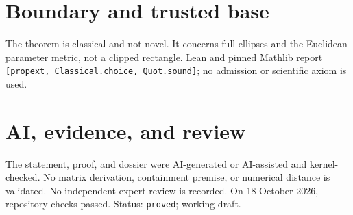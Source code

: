 \documentclass[11pt]{article}
\begin{document}
\section{Boundary and trusted base}
The theorem is classical and not novel. It concerns full ellipses and the Euclidean
parameter metric, not a clipped rectangle. Lean and pinned Mathlib report
\texttt{[propext, Classical.choice, Quot.sound]}; no admission or scientific axiom is used.

\section{AI, evidence, and review}
The statement, proof, and dossier were AI-generated or AI-assisted and kernel-checked.
No matrix derivation, containment premise, or numerical distance is validated. No
independent expert review is recorded. On 18 October 2026, repository checks passed.
Status: \texttt{proved}; working draft.
\end{document}
